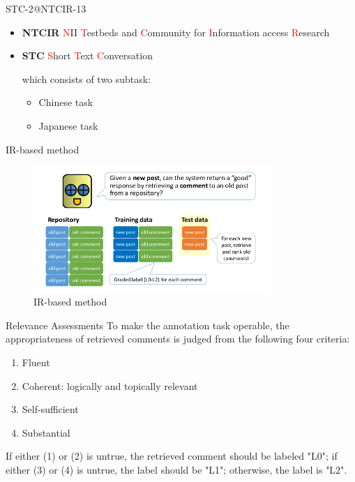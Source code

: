 \documentclass{beamer}
\begin{document}
    \begin{frame}{STC-2@NTCIR-13}
    \begin{itemize}
    \item \textbf{NTCIR} \newline
    \textcolor{red}{N}II \textcolor{red}{T}estbeds and \textcolor{red}{C}ommunity for \textcolor{red}{I}nformation access \textcolor{red}{R}esearch \newline  
    \item \textbf{STC} \newline
    \textcolor{red}{S}hort \textcolor{red}{T}ext \textcolor{red}{C}onversation \newline   
    
    which consists of two subtask: 
        \begin{itemize}
        \item Chinese task
        \item Japanese task
        \end{itemize} 
    \end{itemize}
    \end{frame}

    \begin{frame}{IR-based method}
      \begin{center}
      \begin{figure}
      \includegraphics[width=0.8\textwidth,height=0.6\textheight]{irbased-stc.png}
      \caption{IR-based method}
      \end{figure}
      \end{center}
    \end{frame}

    \begin{frame}{Relevance Assessments}
      To make the annotation task operable, the appropriateness of retrieved comments is judged from the following four criteria:
      \begin{enumerate}
        \item Fluent
        \item Coherent: logically and topically relevant 
        \item Self-sufficient
        \item Substantial
      \end{enumerate}
      If either (1) or (2) is untrue, the retrieved comment should be labeled "L0"; if either (3) or (4) is untrue, the label should be "L1"; otherwise, the label is "L2".
    \end{frame}
\end{document}
